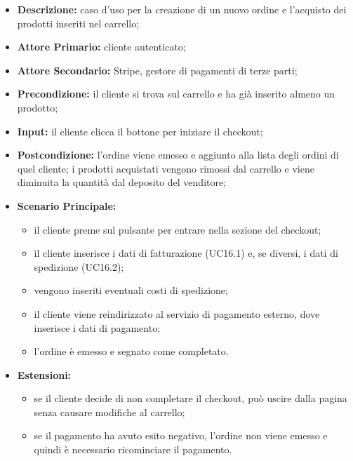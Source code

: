                 \begin{itemize}
                \item \textbf{Descrizione:} caso d'uso per la creazione di un nuovo ordine e l'acquisto dei prodotti inseriti nel carrello;
                \item \textbf{Attore Primario:} cliente autenticato;
                \item \textbf{Attore Secondario:} Stripe, gestore di pagamenti di terze parti;
                \item \textbf{Precondizione:} il cliente si trova sul carrello e ha già inserito almeno un prodotto;
                \item \textbf{Input:} il cliente clicca il bottone per iniziare il checkout;
                \item \textbf{Postcondizione:} l'ordine viene emesso e aggiunto alla lista degli ordini di quel cliente; i prodotti acquistati vengono rimossi dal carrello e viene diminuita la quantità dal deposito del venditore;
                \item \textbf{Scenario Principale:} 
                    \begin{itemize}
                        \item il cliente preme sul pulsante per entrare nella sezione del checkout;
                        \item il cliente inserisce i dati di fatturazione (UC16.1) e, se diversi, i dati di spedizione (UC16.2);
                        \item vengono inseriti eventuali costi di spedizione;
                        \item il cliente viene reindirizzato al servizio di pagamento esterno, dove inserisce i dati di pagamento;
                        \item l'ordine è emesso e segnato come completato.
                    \end{itemize}
                \item \textbf{Estensioni:}
                    \begin{itemize}
                        \item se il cliente decide di non completare il checkout, può uscire dalla pagina senza causare modifiche al carrello;
                        \item se il pagamento ha avuto esito negativo, l'ordine non viene emesso e quindi è necessario ricominciare il pagamento.
                    \end{itemize}
            \end{itemize}
